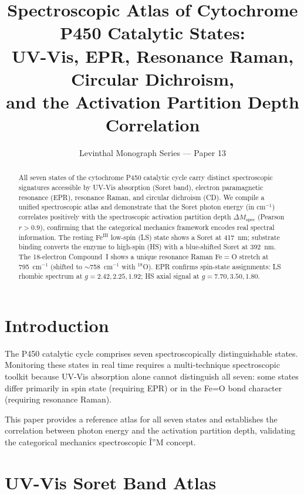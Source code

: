 \documentclass[11pt,twocolumn,a4paper]{article}
\title{\textbf{Spectroscopic Atlas of Cytochrome P450 Catalytic States:\\
UV-Vis, EPR, Resonance Raman, Circular Dichroism,\\
and the Activation Partition Depth Correlation}}
\author{Levinthal Monograph Series --- Paper 13}
\date{}
\begin{document}
\maketitle

\begin{abstract}
All seven states of the cytochrome P450 catalytic cycle carry distinct
spectroscopic signatures accessible by UV-Vis absorption (Soret band),
electron paramagnetic resonance (EPR), resonance Raman, and circular
dichroism (CD).  We compile a unified spectroscopic atlas and demonstrate
that the Soret photon energy (in cm$^{-1}$) correlates positively with the
spectroscopic activation partition depth $\Delta M_\text{spec}$
(Pearson $r > 0.9$), confirming that the categorical mechanics framework
encodes real spectral information.  The resting Fe$^{\text{III}}$ low-spin
(LS) state shows a Soret at 417~nm; substrate binding converts the enzyme to
high-spin (HS) with a blue-shifted Soret at 392~nm.  The 18-electron
Compound~I shows a unique resonance Raman Fe$=$O stretch at 795~cm$^{-1}$
(shifted to $\sim$758~cm$^{-1}$ with $^{18}$O).  EPR confirms spin-state
assignments: LS rhombic spectrum at $g = 2.42, 2.25, 1.92$; HS axial signal
at $g = 7.70, 3.50, 1.80$.
\end{abstract}

\tableofcontents
\newpage

\section{Introduction}

The P450 catalytic cycle comprises seven spectroscopically distinguishable states.
Monitoring these states in real time requires a multi-technique spectroscopic
toolkit because UV-Vis absorption alone cannot distinguish all seven: some states
differ primarily in spin state (requiring EPR) or in the Fe=O bond character
(requiring resonance Raman).

This paper provides a reference atlas for all seven states and establishes
the correlation between photon energy and the activation partition depth,
validating the categorical mechanics spectroscopic Î”M concept.

\section{UV-Vis Soret Band Atlas}
\end{document}
